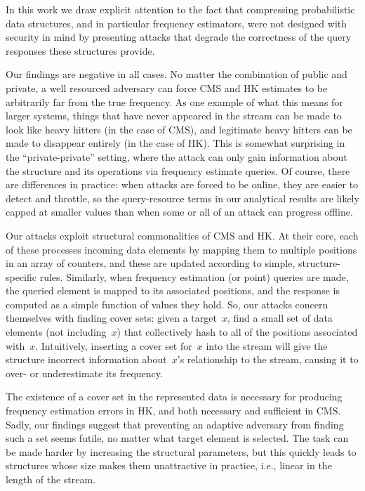In this work we draw explicit attention to the fact that compressing probabilistic data structures, and in particular frequency estimators, were not designed with security in mind by presenting attacks that degrade the correctness of the query responses these structures provide.  

Our findings are negative in all cases.  No matter the combination of public and private, a well resourced adversary can force CMS and HK estimates to be arbitrarily far from the true frequency. As one example of what this means for larger systems, things that have never appeared in the stream can be made to look like heavy hitters (in the case of CMS), and legitimate heavy hitters can be made to disappear entirely (in the case of HK).  This is somewhat surprising in the ``private-private'' setting, where the attack can only gain information about the structure and its operations via frequency estimate queries.  Of course, there are differences in practice: when attacks are forced to be online, they are easier to detect and throttle, so the query-resource terms in our analytical results are likely capped at smaller values than when some or all of an attack can progress offline. 

Our attacks exploit structural commonalities of CMS and HK.  At their core, each of these processes incoming data elements by mapping them to multiple positions in an array of counters, and these are updated according to simple, structure-specific rules. Similarly, 
when frequency estimation (or point) queries are made, the queried element is mapped to its associated positions, and the response is computed as a simple function of values they hold.  So, our attacks concern themselves with finding cover sets: given a target~$x$, find a small set of data elements (not including~$x$) that collectively hash to all of the positions associated with~$x$. Intuitively, inserting a cover set for~$x$ into the stream will give the structure incorrect information about~$x$'s relationship to the stream, causing it to over- or underestimate its frequency. 

The existence of a cover set in the represented data is necessary for producing frequency estimation errors in HK, and both necessary and sufficient in CMS.  Sadly, our findings suggest that preventing an adaptive adversary from finding such a set seems futile, no matter what target element is selected.  The task can be made harder by increasing the structural parameters, but this quickly leads to structures whose size makes them unattractive in practice, i.e., linear in the length of the stream.

